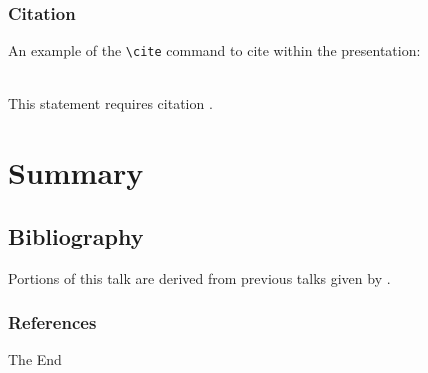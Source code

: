 \documentclass{beamer}
\begin{document}

\begin{frame}[fragile] %
\frametitle{Citation}
An example of the \verb|\cite| command to cite within the presentation:\\~

This statement requires citation \cite{Ignjatovic2009}.
\end{frame}


\section{Summary}

\subsection{Bibliography}

\begin{frame}[allowframebreaks]
Portions of this talk are derived from previous talks given by \cite{Ignjatovic2011,Liu2011}.
\end{frame}

\begin{frame}[allowframebreaks]
	\frametitle{References}
	
	
\end{frame}


\begin{frame}
\Huge{\centerline{The End}}
\end{frame}

\end{document}
